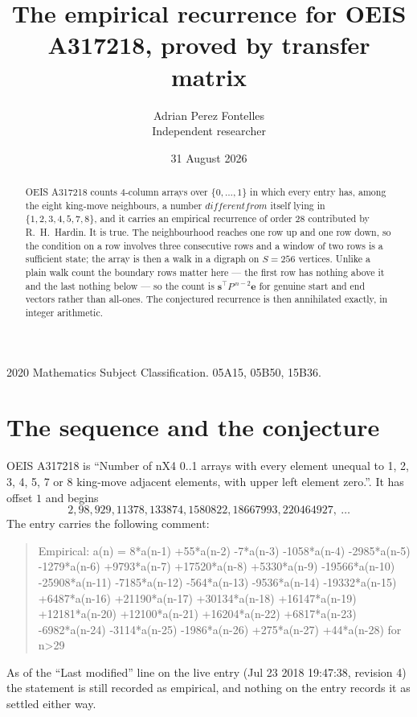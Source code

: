 \documentclass[11pt,a4paper]{article}
\title{The empirical recurrence for OEIS A317218, proved by transfer matrix}
\author{Adrian Perez Fontelles\\ \small Independent researcher}
\date{31 August 2026}
\theoremstyle{plain}
\theoremstyle{definition}
\begin{document}
\maketitle

\begin{abstract}
OEIS A317218 counts $4$-column arrays over $\{0,\dots,1\}$ in which every entry has,
among the eight king-move neighbours, a number $different from$ itself lying in $\{1,2,3,4,5,7,8\}$, and it carries an empirical
recurrence of order $28$ contributed by R.~H.~Hardin. It is true. The neighbourhood
reaches one row up and one row down, so the condition on a row involves three consecutive
rows and a window of two rows is a sufficient state; the array is then a walk in a digraph
on $S=256$ vertices. Unlike a plain walk count the boundary rows matter here --- the first
row has nothing above it and the last nothing below --- so the count is
$\mathbf{s}^{\!\top}P^{\,n-2}\mathbf{e}$ for genuine start and end vectors rather than
all-ones. The conjectured recurrence is then annihilated exactly, in integer arithmetic.
\end{abstract}

\noindent\small 2020 Mathematics Subject Classification. 05A15, 05B50, 15B36.\normalsize

\section{The sequence and the conjecture}

OEIS A317218 is ``Number of nX4 0..1 arrays with every element unequal to 1, 2, 3, 4, 5, 7 or 8 king-move adjacent elements, with upper left element zero.''. It has offset
$1$ and begins
\[
2, 98, 929, 11378, 133874, 1580822, 18667993, 220464927,\ \dots
\]
The entry carries the following comment:
\begin{quote}\small
Empirical: a(n) = 8*a(n-1) +55*a(n-2) -7*a(n-3) -1058*a(n-4) -2985*a(n-5) -1279*a(n-6) +9793*a(n-7) +17520*a(n-8) +5330*a(n-9) -19566*a(n-10) -25908*a(n-11) -7185*a(n-12) -564*a(n-13) -9536*a(n-14) -19332*a(n-15) +6487*a(n-16) +21190*a(n-17) +30134*a(n-18) +16147*a(n-19) +12181*a(n-20) +12100*a(n-21) +16204*a(n-22) +6817*a(n-23) -6982*a(n-24) -3114*a(n-25) -1986*a(n-26) +275*a(n-27) +44*a(n-28) for n>29
\end{quote}
As of the ``Last modified'' line on the live entry (Jul 23 2018 19:47:38, revision
4) the statement is still recorded as empirical, and nothing on the entry
records it as settled either way.
\end{document}
